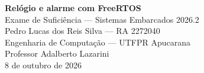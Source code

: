 \documentclass[12pt,a4paper,brazil]{article}
\begin{document}
\begin{center}
{\textbf{\LARGE Relógio e alarme com FreeRTOS}}\\[3mm]
{\large Exame de Suficiência --- Sistemas Embarcados 2026.2}\\[3mm]
Pedro Lucas dos Reis Silva --- RA 2272040\\
Engenharia de Computação --- UTFPR Apucarana\\
Professor Adalberto Lazarini\\[2mm]
8 de outubro de 2026
\end{center}

\FloatBarrier
\printbibliography[heading=bibnumbered,title={Referências}]
\end{document}

